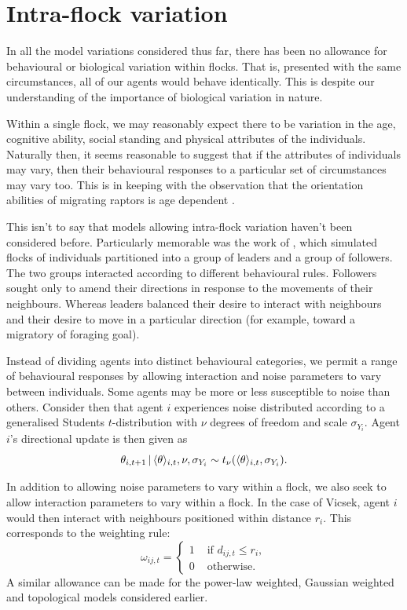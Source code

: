 \section{Intra-flock variation}

In all the model variations considered thus far, there has been no allowance for
behavioural or biological variation within flocks. That is, presented with the same
circumstances, all of our agents would behave identically. This is despite our
understanding of the importance of biological variation in nature.

Within a single flock, we may reasonably expect there to be variation in the age,
cognitive ability, social standing and physical attributes of the individuals. Naturally
then, it seems reasonable to suggest that if the attributes of individuals may vary, then
their behavioural responses to a particular set of circumstances may vary too.
This is in keeping with the observation that the orientation abilities of migrating
raptors is age dependent \parencite{thorup03}.

This isn't to say that models allowing intra-flock variation haven't been considered
before. Particularly memorable was the work of \textcite{couzin05}, which simulated flocks
of individuals partitioned into a group of leaders and a group of followers. The two groups
interacted according to different behavioural rules. Followers sought only to amend their
directions in response to the movements of their neighbours. Whereas leaders balanced
their desire to interact with neighbours and their desire to move in a particular
direction (for example, toward a migratory of foraging goal).

Instead of dividing agents into distinct behavioural categories, we permit a range of
behavioural responses by allowing interaction and noise parameters to vary between
individuals. Some agents may be more or less susceptible to noise than others. Consider
then that agent $i$ experiences noise distributed according to a generalised Students
$t$-distribution with $\nu$ degrees of freedom and scale $\sigma_{Y_i}$. Agent $i$'s
directional update is then given as
\begin{equation*}
    \theta_{i,t+1} \,|\, \langle\theta\rangle_{i,t}, \nu, \sigma_{Y_i} \sim
    t_{\nu}(\langle\theta\rangle_{i,t}, \sigma_{Y_i}).
\end{equation*}

In addition to allowing noise parameters to vary within a flock, we also seek to allow
interaction parameters to vary within a flock. In the case of Vicsek, agent $i$ would then
interact with neighbours positioned within distance $r_i$. This corresponds to the
weighting rule:
\begin{equation}
    \omega_{ij,t} =
    \begin{cases}
        1 & \text{ if } d_{ij, t} \leq r_i,\\
        0 & \text{ otherwise.}
    \end{cases}
\end{equation}
A similar allowance can be made for the power-law weighted, Gaussian weighted and
topological models considered earlier.

